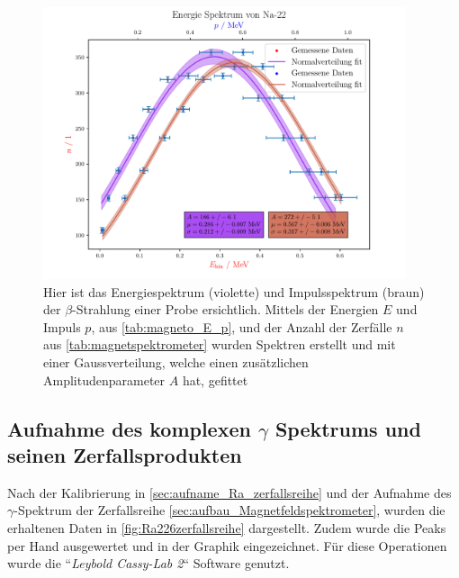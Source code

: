 \documentclass[12pt,english,ngerman]{scrartcl}
\begin{document}
\begin{figure}[H]
  \begin{center}
    \includegraphics[width = 0.95\textwidth]{figures/energiespektrum.pdf}
  \end{center}
  \caption[Energie- und Impulsspektrogram der $\beta$-Strahlung einer
   Probe]{Hier ist das Energiespektrum (violette) und
  Impulsspektrum (braun) der $\beta$-Strahlung einer  Probe
ersichtlich. Mittels der Energien $E$ und Impuls $p$, aus
\autoref{tab:magneto_E_p}, und der Anzahl der Zerfälle $n$ aus
\autoref{tab:magnetspektrometer} wurden Spektren erstellt und mit einer
Gaussverteilung, welche einen zusätzlichen Amplitudenparameter $A$ hat,
gefittet}
  \label{fig:magneto_E_p}
\end{figure}


\subsection{Aufnahme des komplexen \texorpdfstring{$\gamma$}{gamma} Spektrums
und seinen Zerfallsprodukten}

Nach der Kalibrierung in \autoref{sec:aufname_Ra_zerfallsreihe} und der
Aufnahme des \(\gamma\)-Spektrum der  Zerfallsreihe
\autoref{sec:aufbau_Magnetfeldspektrometer}, wurden die erhaltenen Daten in
\autoref{fig:Ra226zerfallsreihe} dargestellt. Zudem wurde die Peaks per Hand
ausgewertet und in der Graphik eingezeichnet. Für diese Operationen wurde die
``\emph{Leybold Cassy-Lab 2}`` Software genutzt.
\end{document}
